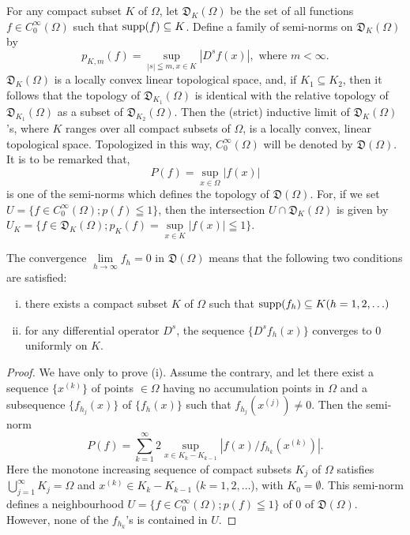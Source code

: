 For any compact subset $K$ of $\Omega$, let $\mathfrak{D}_K(\Omega)$ be the set of all functions $f \in C_0^\infty(\Omega)$ such that $\operatorname{supp}(f) \subseteq K$. Define a family of semi-norms on $\mathfrak{D}_K(\Omega)$ by 
\[
p_{K,m} (f) = \sup\limits_{| s | \leqq m, x \in K} | D ^{s} f (x) |, \text{ where } m < \infty .
\]
$\mathfrak{D}_K(\Omega)$ is a locally convex linear topological space, and, if $K_{1} \subseteq K_{2}$, then it follows that the topology of $\mathfrak{D}_{K_1}(\Omega)$ is identical with the relative topology of $\mathfrak{D}_{K_1}(\Omega)$ as a subset of $\mathfrak{D}_{K_2}(\Omega)$. Then the (strict) inductive limit of $\mathfrak{D}_K(\Omega)$'s, where $K$ ranges over all compact subsets of $\Omega$, is a locally convex, linear topological space. Topologized in this way, $C_0^\infty(\Omega)$ will be denoted by $\mathfrak{D}(\Omega)$. It is to be remarked that, 
\[
P(f) = \sup\limits_{x \in \Omega} | f (x) |
\]
is one of the semi-norms which defines the topology of $\mathfrak{D}(\Omega)$. For, if we set $U = \{f \in C_0^\infty(\Omega); p(f) \leqq 1\}$, then the intersection $U \cap \mathfrak{D}_K(\Omega)$ is given by $U_K = \{f \in \mathfrak{D}_K(\Omega); p_K(f) = \sup\limits_{x \in K} |f(x)| \leqq 1\}$. 

\begin{proposition}\label{prop:I.1.Proposition.7} The convergence $\lim\limits_{h\to \infty}f_h = 0$ in $\mathfrak{D}(\Omega)$ means that the following two conditions are satisfied: \begin{enumerate}[(i)]
\item there exists a compact subset $K$ of $\Omega$ such that $\operatorname{supp}(f_h)\subseteq K(h = 1,2,\ldots)$
\item for any differential operator $D^{s}$, the sequence $\{D^s f_h(x)\}$ converges to $0$ uniformly on $K$.
\end{enumerate}
\end{proposition}

\begin{proof}
 We have only to prove (i). Assume the contrary, and let there exist a sequence $\{x^{(k)}\}$ of points $\in\Omega$ having no accumulation points in $\Omega$ and a subsequence $\{f_{h_{j}}(x)\}$ of $\{f_{h}(x)\}$ such that $f_{h_{j}}(x^{(j)})\neq0$. Then the semi-norm 
\[
P(f) = \sum\limits_{k=1}^{\infty} 2\sup\limits_{x\in K_k-K_{k-1}}
\left|f(x)/f_{h_k}\left(x^{(k)}\right)\right|.
\]
\begingroup\everymath{}
Here the monotone increasing sequence of compact subsets $K_j$ of $\Omega$
satisfies $\bigcup_{j=1}^{\infty}K_j=\Omega$ and
$x^{(k)}\in K_k-K_{k-1}$ ($k=1,2,\ldots$), with $K_0=\emptyset$.
This semi-norm defines a neighbourhood $U = \{f \in C_0^\infty(\Omega); p(f) \leqq 1\}$ of $0$ of $\mathfrak{D}(\Omega)$. However, none of the $f_{h_{k}}$'s is contained in $U$. \qedhere\par\endgroup 
\end{proof}

